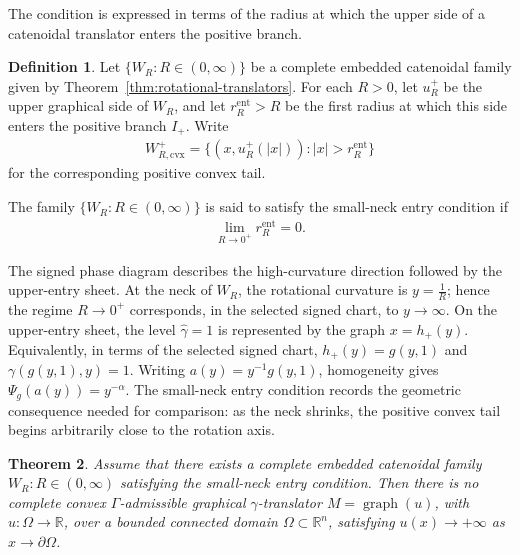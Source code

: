 \documentclass{amsart}
\theoremstyle{plain}
\newtheorem{theorem}{Theorem}[section]
\theoremstyle{mainintrothm}
\theoremstyle{definition}
\newtheorem{definition}[theorem]{Definition}
\begin{document}
	\medskip
	
	The condition is expressed in terms of the radius at which the upper side of a
	catenoidal translator enters the positive branch.
	
	\begin{definition}
		\label{def:small-neck-catenoidal-family}
		Let $\{W_R:R\in(0,\infty)\}$ be a complete embedded catenoidal family given
		by Theorem~\ref{thm:rotational-translators}.  For each $R>0$, let $u_R^+$
		be the upper graphical side of $W_R$, and let $r_R^{\mathrm{ent}}>R$ be the
		first radius at which this side enters the positive branch $I_+$.  Write
		\begin{align*}
			W_{R,\mathrm{cvx}}^+
			=
			\{(x,u_R^+(|x|)):|x|>r_R^{\mathrm{ent}}\}
		\end{align*}
		for the corresponding positive convex tail.
		
		The family $\{W_R:R\in(0,\infty)\}$ is said to satisfy the small-neck
		entry condition if
		\begin{align}
			\label{eq:small-neck-entry-section-seven}
			\lim\limits_{R\to0^+}r_R^{\mathrm{ent}}=0.
		\end{align}
	\end{definition}
	
	\medskip
	
	The signed phase diagram describes the high-curvature direction followed by the
	upper-entry sheet.  At the neck of $W_R$, the rotational curvature is
	$y=\frac{1}{R}$; hence the regime $R\to0^+$ corresponds, in the selected signed
	chart, to $y\to\infty$.  On the upper-entry sheet, the level
	$\widehat\gamma=1$ is represented by the graph $x=h_+(y)$.  Equivalently, in
	terms of the selected signed chart, $h_+(y)=g(y,1)$ and $\gamma(g(y,1),y)=1$. Writing $a(y)=y^{-1}g(y,1)$, homogeneity gives $\Psi_g(a(y))=y^{-\alpha}$.  The small-neck entry condition records the
	geometric consequence needed for comparison: as the neck shrinks, the positive
	convex tail begins arbitrarily close to the rotation axis.
	
\begin{theorem}
	\label{thm:first-contact-convex-catenoidal-tail}
	Assume that there exists a complete embedded catenoidal family
	${W_R:R\in(0,\infty)}$ satisfying the small-neck entry condition.  Then
	there is no complete convex $\Gamma$-admissible graphical
	$\gamma$-translator $M=\operatorname{graph}(u)$, with
	$u:\Omega\to\mathbb R$, over a bounded connected domain
	$\Omega\subset\mathbb R^n$, satisfying $u(x)\to+\infty$ as $x\to\partial\Omega$.
\end{theorem}
\end{document}

